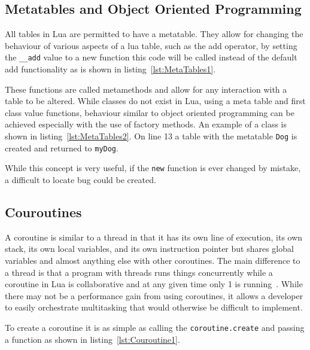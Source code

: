 \documentclass[11pt,a4paper,titlepage]{report}
\begin{document}
\subsection{Metatables and Object Oriented Programming}
	All tables in Lua are permitted to have a metatable\cite{Ierusalimschy:2013:PLT:2502646}. They allow for changing the behaviour of various aspects of a lua table, such as the add operator, by setting the \texttt{\_\_add} value to a new function this code will be called instead of the default add functionality as is shown in listing~\ref{lst:MetaTables1}.
	

	These functions are called metamethods and allow for any interaction with a table to be altered. While classes do not exist in Lua, using a meta table and first class value functions, behaviour similar to object oriented programming can be achieved especially with the use of factory methods. An example of a class is shown in listing~\ref{lst:MetaTables2}. On line 13 a table with the metatable \texttt{Dog} is created and returned to \texttt{myDog}.
	

	While this concept is very useful, if the \texttt{new} function is ever changed by mistake, a difficult to locate bug could be created.

\subsection{Couroutines}
	A coroutine is similar to a thread in that it has its own line of execution, its own stack, its own local variables, and its own instruction pointer but shares global variables and almost anything else with other coroutines. The main difference to a thread is that a program with threads runs things concurrently while a coroutine in Lua is collaborative and at any given time only 1 is running~\cite{Ierusalimschy:2013:PLT:2502646}. While there may not be a performance gain from using coroutines, it allows a developer to easily orchestrate multitasking that would otherwise be difficult to implement.

	To create a coroutine it is as simple as calling the \texttt{coroutine.create} and passing a function as shown in listing~\ref{lst:Couroutine1}.
	 
\end{document}
